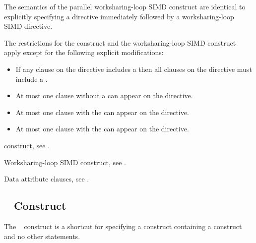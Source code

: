 \descr
The semantics of the parallel worksharing-loop SIMD construct are identical 
to explicitly specifying a  directive immediately followed by 
a worksharing-loop SIMD directive.

\restrictions
The restrictions for the  construct and the worksharing-loop
SIMD construct apply except for the following explicit modifications:

\begin{itemize}
\item If any  clause on the directive includes a
       then all  clauses
      on the directive must include a .
\item At most one  clause without a
       can appear on the directive.
\item At most one  clause with the 
       can appear on the directive.
\item At most one  clause with the 
       can appear on the directive.
\end{itemize}

\begin{crossrefs}
\item {} construct, see
.

\item Worksharing-loop SIMD construct, see
.

\item Data attribute clauses, see
.
\end{crossrefs}



\subsection{~ Construct}
\label{subsec:parallel master Construct}

\summary
The ~ construct is a shortcut for specifying a 
 construct containing a  construct and no other 
statements.

